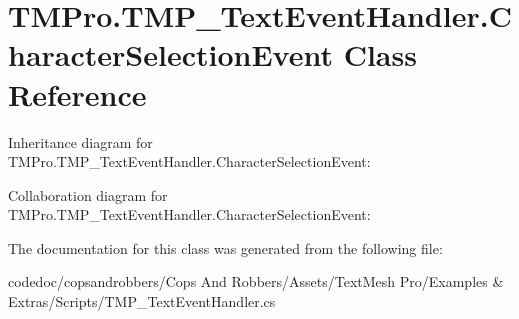 \hypertarget{classTMPro_1_1TMP__TextEventHandler_1_1CharacterSelectionEvent}{}\section{T\+M\+Pro.\+T\+M\+P\+\_\+\+Text\+Event\+Handler.\+Character\+Selection\+Event Class Reference}
\label{classTMPro_1_1TMP__TextEventHandler_1_1CharacterSelectionEvent}


Inheritance diagram for T\+M\+Pro.\+T\+M\+P\+\_\+\+Text\+Event\+Handler.\+Character\+Selection\+Event\+:


Collaboration diagram for T\+M\+Pro.\+T\+M\+P\+\_\+\+Text\+Event\+Handler.\+Character\+Selection\+Event\+:


The documentation for this class was generated from the following file\+:\begin{DoxyCompactItemize}
\item 
codedoc/copsandrobbers/\+Cops And Robbers/\+Assets/\+Text\+Mesh Pro/\+Examples \& Extras/\+Scripts/T\+M\+P\+\_\+\+Text\+Event\+Handler.\+cs\end{DoxyCompactItemize}
